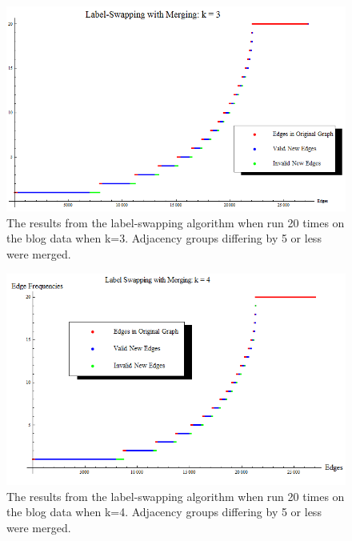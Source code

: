 \begin{figure}[ht]
  \centering
  \includegraphics[scale=0.8]{s40_k_3_det.png}
  \caption{The results from the label-swapping algorithm when run 20 times on the blog data when k=3. Adjacency groups differing by 5 or less were merged.}
  \label{fig:s40-k=3-merge}
\end{figure}

\begin{figure}[ht]
  \centering
  \includegraphics[scale=0.8]{s40_k_4_det.png}
  \caption{The results from the label-swapping algorithm when run 20 times on the blog data when k=4. Adjacency groups differing by 5 or less were merged.}
  \label{fig:s40-k=3-merge}
\end{figure}
